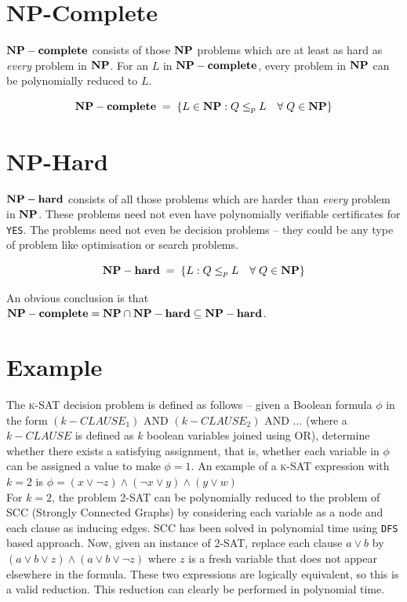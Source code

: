 \section{NP-Complete}
$\mathbf{NP-complete}$ consists of those $\mathbf{NP}$ problems which are at least as hard as \emph{every} problem in $\mathbf{NP}$. 
For an $L$ in $\mathbf{NP-complete}$, every problem in $\mathbf{NP}$ can be polynomially reduced to $L$.

\[
\mathbf{NP-complete} \; = \; \{L \in \mathbf{NP} : Q \le_p L \quad \forall \; Q \in \mathbf{NP}\}
\]

\section{NP-Hard}
$\mathbf{NP-hard}$ consists of all those problems which are harder than \emph{every} problem in $\mathbf{NP}$. These problems 
need not even have polynomially verifiable certificates for \texttt{YES}. The problems need not even be 
decision problems -- they could be any type of problem like optimisation or search problems. 

\[
\mathbf{NP-hard} \; = \; \{L: Q \le_p L \quad \forall \; Q \in \mathbf{NP}\}
\]

An obvious conclusion is that $\mathbf{NP-complete} = \mathbf{NP} \cap \mathbf{NP-hard} \subseteq \mathbf{NP-hard}$.



\section*{Example}

The \textsc{k-SAT} decision problem is defined as follows -- given a Boolean formula $\phi$ in 
the form $(k-CLAUSE_1)$ AND $(k-CLAUSE_2)$ AND $\dots$ (where a $k-CLAUSE$ is defined as $k$ boolean 
variables joined using OR), determine whether there exists a satisfying assignment, that is, whether 
each variable in $\phi$ can be assigned a value to make $\phi = 1$. An example of a \textsc{k-SAT} 
expression with $k=2$ is $\phi = (x \vee \neg z) \wedge (\neg x \vee y) \wedge (y \vee w)$\\


\noindent For $k=2$, the problem \textsc{2-SAT} can be polynomially reduced to the problem of 
\textsc{SCC} (Strongly Connected Graphs) by considering each variable as a node and each clause as inducing 
edges. \textsc{SCC} has been solved in polynomial time using \texttt{DFS} based approach. 
Now, given an instance of \textsc{2-SAT}, replace each clause $a\vee b$ by 
$(a\vee b\vee z)\wedge(a\vee b\vee\neg z)$ where $z$ is a fresh variable that does not appear 
elsewhere in the formula. These two expressions are logically equivalent, so this is a valid reduction. 
This reduction can clearly be performed in polynomial time.

